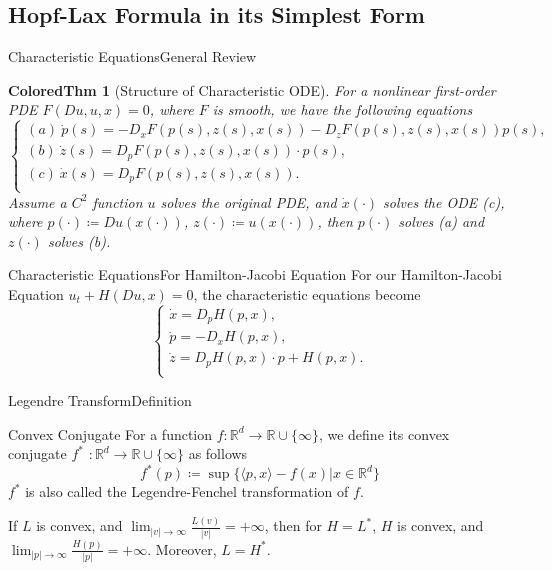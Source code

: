 \documentclass[english]{pkuslide}
\newtheorem{ColoredThm}{ColoredThm}
\begin{document}
\subsection{Hopf-Lax Formula in its Simplest Form}
\begin{frame}{Characteristic Equations}{General Review}
\begin{ColoredThm}[Structure of Characteristic ODE]
For a nonlinear first-order PDE $F(Du,u,x) = 0$, where $F$ is smooth, we have the following equations
\begin{equation}
  \left\{
   \begin{array}{l}
   (a)\ \dot{p}(s) = -D_{x}F(p(s),z(s),x(s))-D_{z}F(p(s),z(s),x(s))p(s), \\
    (b)\ \dot{z}(s) = D_{p}F(p(s),z(s),x(s))\cdot p(s), \\
    (c)\ \dot{x}(s) = D_{p}F(p(s),z(s),x(s)).  \\
   \end{array}
  \right.
\end{equation}
Assume a $C^2$ function $u$ solves the original PDE, and $\dot{x}(\cdot)$ solves the ODE (c), where $p(\cdot) \coloneqq Du(x(\cdot))$, $z(\cdot) \coloneqq u(x(\cdot))$, then $p(\cdot)$ solves (a) and $z(\cdot)$ solves (b).
\end{ColoredThm}

	\end{frame}
\begin{frame}{Characteristic Equations}{For Hamilton-Jacobi Equation}
For our Hamilton-Jacobi Equation $u_{t} + H(Du, x) = 0$, the characteristic equations become
\begin{equation}
  \left\{
   \begin{array}{l}
   \dot{x}= D_{p}H(p, x), \\
   \dot{p}= -D_{x}H(p, x), \\
\dot{z} = D_{p}H(p,x)\cdot p + H(p, x).  \\
   \end{array}
  \right.
\end{equation}
	\end{frame}
	\begin{frame}{Legendre Transform}{Definition}
\begin{exampleblock}{Convex Conjugate}
For a function \begin{math} f :  \mathbb{R}^{d} \to \mathbb{R} \cup \{ \infty \} \end{math}, we define its convex conjugate $f^{*}$ \begin{math}:\mathbb{R}^{d} \to \mathbb{R} \cup \{ \infty \} \end{math} as follows
\begin{equation}
 f^{*}(p) \coloneqq \sup \{\langle p, x\rangle -f(x) | x \in \mathbb{R}^{d} \}
\end{equation}
$f^{*}$ is also called the Legendre-Fenchel transformation of $f$.
\end{exampleblock}
If $L$ is convex, and $\lim_{|v| \to \infty}\frac{L(v)}{|v|}=+\infty$, then for $H=L^*$, $H$ is convex, and $\lim_{|p| \to \infty}\frac{H(p)}{|p|}=+\infty$. Moreover, $L=H^*$.
	\end{frame}
\end{document}
